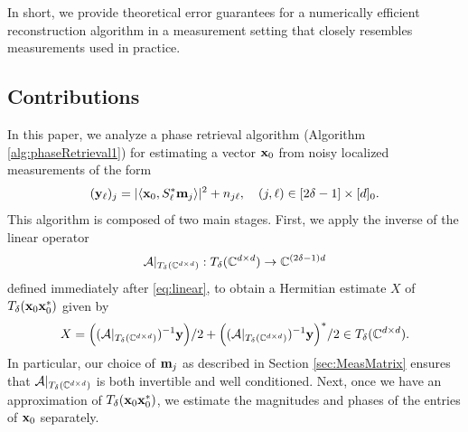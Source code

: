 In short, we provide theoretical error guarantees for a numerically efficient reconstruction algorithm in a measurement setting that closely resembles measurements used in practice.

\subsection{Contributions}
\label{sec:mainRes}

In this paper, we analyze a phase retrieval algorithm (Algorithm \ref{alg:phaseRetrieval1}) for estimating a vector $\mathbf x_0$ from noisy localized measurements of the form
 \begin{equation} (\mathbf y_\ell)_j = |\langle \mathbf x_0, S^*_\ell \mathbf m_j \rangle|^2 + n_{j \ell}, \quad (j, \ell) \in [2\delta-1] \times [d]_0 \label{eq:shift_model_noise}.\end{equation}
 This algorithm is composed of two main stages. First, we apply the inverse of the linear operator $$\mathcal{A}|_{T_{\delta}(\mathbb{C}^{d \times d})}: T_{\delta}(\mathbb{C}^{d\times d}) \to \mathbb{C}^{(2\delta-1)d}$$ defined immediately after \eqref{eq:linear}, to obtain a Hermitian estimate ${X}$ of $T_\delta{(\mathbf x_0\mathbf x_0^*)}$ given by 
  \begin{equation}X = \Big( (\mathcal{A}|_{T_\delta(\mathbb{C}^{d\times d})})^{-1} {\bf y}\Big)/2 + \Big( (\mathcal{A}|_{T_\delta(\mathbb{C}^{d\times d})})^{-1} {\bf y}\Big)^*/2  \in T_\delta(\mathbb{C}^{d\times d}) \label{eq:X}.\end{equation}  In particular, our choice of $\mathbf m_j$ as described in Section \ref{sec:MeasMatrix} ensures that $\mathcal{A}|_{T_{\delta}(\mathbb{C}^{d \times d})}$ is both invertible and well conditioned. Next, once we have an approximation of $T_\delta(\mathbf x_0 \mathbf x_0^*)$, we estimate the magnitudes and phases of the entries of $\mathbf x_0$ separately. 
  
